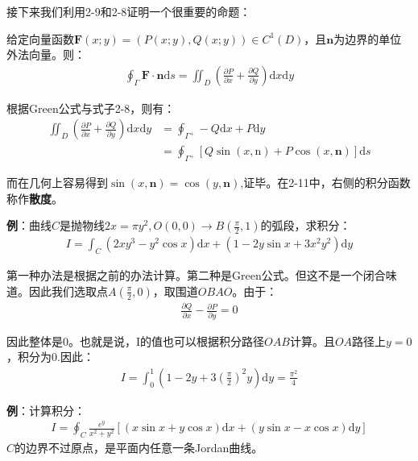 \documentclass{ctexart}
\let\oldtextbf\textbf
\renewcommand{\textbf}[1]{\textcolor{brown!50!red}{\oldtextbf{#1}}}
\begin{document}
接下来我们利用2-9和2-8证明一个很重要的命题：
\begin{tcolorbox}[
    colback=bac1,     %
    colframe=fra1,   %
    coltitle=white,             %
    coltext=tex1,
    title=Green公式推论,
    fonttitle=\bfseries,        %
arc=3mm,                     %
breakable
]
给定向量函数$\bm{F}(x;y)=(P(x;y),Q(x;y))\in C^1(D)$，且$\bm{n}$为边界的单位外法向量。则：
\begin{align*}
\oint_{\Gamma}\bm{F}\cdot\bm{n}\mathrm{d}s=\iint_D(\frac{\partial  P}{\partial x}
+\frac{\partial  Q}{\partial  y}  )\mathrm{d}x\mathrm{d}y\tag{2-11}   
\end{align*}

根据Green公式与式子2-8，则有：
\begin{align*}
\iint_D(\frac{\partial  P}{\partial x}
+\frac{\partial  Q}{\partial  y}  )\mathrm{d}x\mathrm{d}y&=
\oint_{\Gamma^+}-Q\mathrm{d}x+P\mathrm{d}y \\
&=\oint_{\Gamma^+}[Q\sin(x,\mathrm{n} )+P\cos(x,\bm{n}) ]\mathrm{d}s 
\end{align*}

而在几何上容易得到$\sin(x,\bm{n})=\cos(y,\bm{n})$,证毕。在2-11中，右侧的积分函数称作\textbf{\color{brown!50!red}散度}。
\end{tcolorbox}

\textbf{\color{brown!50!red}例}：曲线$C$是抛物线$2x=\pi y^2,O(0,0)\to B(\frac{\pi}{2},1)$的弧段，求积分：
\begin{align*}
I=\int_C(2xy^3-y^2\cos x)\mathrm{d}x+(1-2y\sin x+3x^2y^2)\mathrm{d}y  
\end{align*}

第一种办法是根据之前的办法计算。第二种是Green公式。但这不是一个闭合味道。因此我们选取点$A(\frac{\pi}{2},0)$，取围道$OBAO$。由于：
\begin{align*}
\frac{\partial  Q}{\partial  x}-
\frac{\partial P}{\partial  y}  =0
\end{align*}

因此整体是0。也就是说，I的值也可以根据积分路径$OAB$计算。且$OA$路径上$y=0$，积分为0.因此：
\begin{align*}
I=\int_0^1(1-2y+3(\frac{\pi}{2})^2y)\mathrm{d}y=\frac{\pi^2}{4}   
\end{align*}

\textbf{\color{brown!50!red}例}：计算积分：
\begin{align*}
I=\oint_C\frac{e^y}{x^2+y^2}[(x\sin x+y\cos x)\mathrm{d}x+(y\sin x-x\cos x)\mathrm{d}y]   
\end{align*}
$C$的边界不过原点，是平面内任意一条Jordan曲线。
\end{document}

